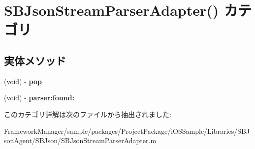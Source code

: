 \hypertarget{category_s_b_json_stream_parser_adapter_07_08}{}\section{S\+B\+Json\+Stream\+Parser\+Adapter() カテゴリ}
\label{category_s_b_json_stream_parser_adapter_07_08}
\subsection*{実体メソッド}
\begin{DoxyCompactItemize}
\item 
\hypertarget{category_s_b_json_stream_parser_adapter_07_08_a3dc3665abef287573c9fad2a9eabb6b3}{}(void) -\/ {\bfseries pop}\label{category_s_b_json_stream_parser_adapter_07_08_a3dc3665abef287573c9fad2a9eabb6b3}

\item 
\hypertarget{category_s_b_json_stream_parser_adapter_07_08_af2059c2ce23ed04a633afe6d331291e0}{}(void) -\/ {\bfseries parser\+:found\+:}\label{category_s_b_json_stream_parser_adapter_07_08_af2059c2ce23ed04a633afe6d331291e0}

\end{DoxyCompactItemize}


このカテゴリ詳解は次のファイルから抽出されました\+:\begin{DoxyCompactItemize}
\item 
Framework\+Manager/sample/packages/\+Project\+Package/i\+O\+S\+Sample/\+Libraries/\+S\+B\+Json\+Agent/\+S\+B\+Json/S\+B\+Json\+Stream\+Parser\+Adapter.\+m\end{DoxyCompactItemize}
